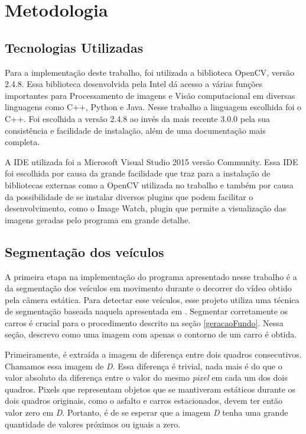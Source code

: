 \chapter{Metodologia} \label{Metodologia}


\section{Tecnologias Utilizadas} \label{tecnologiasUtilizadas}

    Para a implementação deste trabalho, foi utilizada a biblioteca OpenCV, versão 2.4.8. Essa biblioteca desenvolvida pela Intel dá acesso a várias funções importantes para Processamento de imagens e Visão computacional em diversas linguagens como C++, Python e Java. Nesse trabalho a linguagem escolhida foi o C++. Foi escolhida a versão 2.4.8 ao invés da mais recente 3.0.0 pela sua consistência e facilidade de instalação, além de uma documentação mais completa.
    
    A IDE utilizada foi a Microsoft Visual Studio 2015 versão Community. Essa IDE foi escolhida por causa da grande facilidade que traz para a instalação de bibliotecas externas como a OpenCV utilizada no trabalho e também por causa da possibilidade de se instalar diversos plugins que podem facilitar o desenvolvimento, como o Image Watch, plugin que permite a visualização das imagens geradas pelo programa em grande detalhe.





\section{Segmentação dos veículos} \label{segmentacaoVeiculos}

    A primeira etapa na implementação do programa apresentado nesse trabalho é a da segmentação dos veículos em movimento durante o decorrer do vídeo obtido pela câmera estática. Para detectar esse veículos, esse projeto utiliza uma técnica de segmentação baseada naquela apresentada em \cite{hai2009self}. Segmentar corretamente os carros é crucial para o procedimento descrito na seção \ref{geracaoFundo}. Nessa seção, descrevo como uma imagem com apenas o contorno de um carro é obtida.

    Primeiramente, é extraída a imagem de diferença entre dois quadros consecutivos. Chamamos essa imagem de \textit{D}. Essa diferença é trivial, nada mais é do que o valor absoluto da diferença entre o valor do mesmo \textit{pixel} em cada um dos dois quadros. Pixels que representam objetos que se mantiveram estáticos durante os dois quadros originais, como o asfalto e carros estacionados, devem ter então valor zero em \textit{D}. Portanto, é de se esperar que a imagem \textit{D} tenha uma grande quantidade de valores próximos ou iguais a zero.

